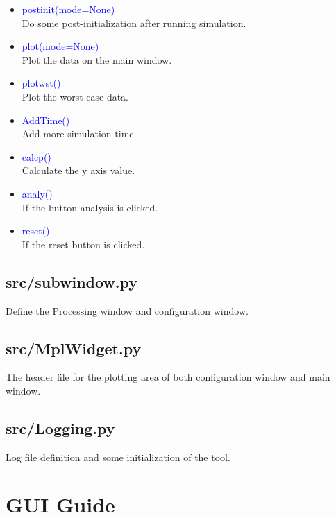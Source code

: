 \documentclass[12pt,a4paper]{article}
\begin{document}
\begin{itemize}[leftmargin=*]
\begin{itemize}
    \item \textcolor{blue}{postinit(mode=None)}\\
        Do some post-initialization after running simulation.

    \item \textcolor{blue}{plot(mode=None)}\\
        Plot the data on the main window.

    \item \textcolor{blue}{plotwst()}\\
        Plot the worst case data.

    \item \textcolor{blue}{AddTime()}\\
        Add more simulation time.

    \item \textcolor{blue}{calcp()}\\
        Calculate the y axis value.

    \item \textcolor{blue}{analy()}\\
        If the button analysis is clicked.

    \item \textcolor{blue}{reset()}\\
        If the reset button is clicked.

\end{itemize}

\subsection{src/\textunderscore subwindow.py}
Define the Processing window and configuration window.

\subsection{src/MplWidget.py}
The header file for the plotting area of both configuration window and main window.

\subsection{src/Logging.py}
Log file definition and some initialization of the tool.

\end{itemize}


\section{GUI Guide}
\end{document}
